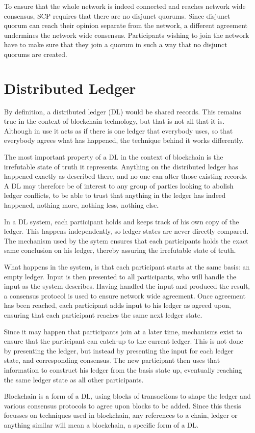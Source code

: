 \documentclass[12pt]{report}
\theoremstyle{plain}
\theoremstyle{definition}
\begin{document}
	To ensure that the whole network is indeed connected and reaches network wide consensus, SCP requires that there are no disjunct quorums. Since disjunct quorum can reach their opinion separate from the network, a different agreement undermines the network wide consensus. Participants wishing to join the network have to make sure that they join a quorum in such a way that no disjunct quorums are created.
	
	\section{Distributed Ledger}
	By definition, a distributed ledger\cite{distributedledger} (DL) would be shared records. This remains true in the context of blockchain technology, but that is not all that it is. Although in use it acts as if there is one ledger that everybody uses, so that everybody agrees what has happened, the technique behind it works differently.
	
	The most important property of a DL in the context of blockchain is the irrefutable state of truth it represents. Anything on the distributed ledger has happened exactly as described there, and no-one can alter those existing records. A DL may therefore be of interest to any group of parties looking to abolish ledger conflicts, to be able to trust that anything in the ledger has indeed happened, nothing more, nothing less, nothing else.
	
	In a DL system, each participant holds and keeps track of his own copy of the ledger. This happens independently, so ledger states are never directly compared. The mechanism used by the sytem ensures that each participants holds the exact same conclusion on his ledger, thereby assuring the irrefutable state of truth.
	
	What happens in the system, is that each participant starts at the same basis: an empty ledger. Input is then presented to all participants, who will handle the input as the system describes. Having handled the input and produced the result, a consensus protocol is used to ensure network wide agreement. Once agreement has been reached, each participant adds input to his ledger as agreed upon, ensuring that each participant reaches the same next ledger state.
	
	Since it may happen that participants join at a later time, mechanisms exist to ensure that the participant can catch-up to the current ledger. This is not done by presenting the ledger, but instead by presenting the input for each ledger state, and corresponding consensus. The new participant then uses that information to construct his ledger from the basis state up, eventually reaching the same ledger state as all other participants.
	
	Blockchain is a form of a DL, using blocks of transactions to shape the ledger and various consensus protocols to agree upon blocks to be added. Since this thesis focusses on techniques used in blockchain, any references to a chain, ledger or anything similar will mean a blockchain, a specific form of a DL.
\end{document}
